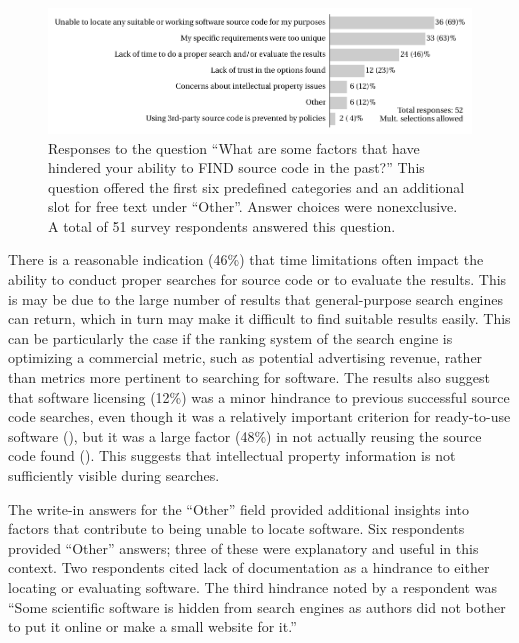 \documentclass{casicswhitepaper}
\begin{document}
\begin{figure}[htb]
  \centering
  \includegraphics[width=6in]{files/plots/factors-that-hindered-finding-src.pdf}
  \vspace*{-2ex}
  \caption{Responses to the question ``What are some factors that have hindered your ability to FIND source code in the past?''  This question offered the first six predefined categories and an additional slot for free text under ``Other''.  Answer choices were nonexclusive.  A total of 51 survey respondents answered this question.}
  \label{factors-that-hindered}
\end{figure}

There is a reasonable indication (46\%) that time limitations often impact the ability to conduct proper searches for source code or to evaluate the results. This is may be due to the large number of results that general-purpose search engines can return, which in turn may make it difficult to find suitable results easily. This can be particularly the case if the ranking system of the search engine is optimizing a commercial metric, such as potential advertising revenue, rather than metrics more pertinent to searching for software.  The results also suggest that software licensing (12\%) was a minor hindrance to previous successful source code searches, even though it was a relatively important criterion for ready-to-use software (), but it was a large factor (48\%) in not actually reusing the source code found (). This suggests that intellectual property information is not sufficiently visible during searches.

%

The write-in answers for the ``Other'' field provided additional insights into factors that contribute to being unable to locate software.  Six respondents provided ``Other'' answers; three of these were explanatory and useful in this context.  Two respondents cited lack of documentation as a hindrance to either locating or evaluating software.  The third hindrance noted by a respondent was ``Some scientific software is hidden from search engines as authors did not bother to put it online or make a small website for it.''
\end{document}
